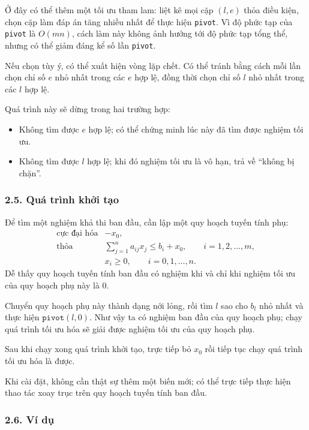 \documentclass[11pt]{article}
\begin{document}
Ở đây có thể thêm một tối ưu tham lam: liệt kê mọi cặp \((l,e)\) thỏa điều
kiện, chọn cặp làm đáp án tăng nhiều nhất để thực hiện \texttt{pivot}. Vì độ
phức tạp của \texttt{pivot} là \(O(mn)\), cách làm này không ảnh hưởng tới độ
phức tạp tổng thể, nhưng có thể giảm đáng kể số lần \texttt{pivot}.

Nếu chọn tùy ý, có thể xuất hiện vòng lặp chết. Có thể tránh bằng cách mỗi
lần chọn chỉ số \(e\) nhỏ nhất trong các \(e\) hợp lệ, đồng thời chọn chỉ số
\(l\) nhỏ nhất trong các \(l\) hợp lệ.

Quá trình này sẽ dừng trong hai trường hợp:
\begin{itemize}
  \item Không tìm được \(e\) hợp lệ; có thể chứng minh lúc này đã tìm được
  nghiệm tối ưu.
  \item Không tìm được \(l\) hợp lệ; khi đó nghiệm tối ưu là vô hạn, trả về
  ``không bị chặn''.
\end{itemize}

\subsubsection*{2.5. Quá trình khởi tạo}

Để tìm một nghiệm khả thi ban đầu, cần lập một quy hoạch tuyến tính phụ:
\[
\begin{array}{ll}
\text{cực đại hóa} & -x_0,\\[0.3em]
\text{thỏa} &
  \displaystyle \sum_{j=1}^{n}a_{ij}x_j\le b_i+x_0,
  \qquad i=1,2,\ldots,m,\\[0.4em]
& x_i\ge 0,\qquad i=0,1,\ldots,n.
\end{array}
\]
Dễ thấy quy hoạch tuyến tính ban đầu có nghiệm khi và chỉ khi nghiệm tối ưu
của quy hoạch phụ này là \(0\).

Chuyển quy hoạch phụ này thành dạng nới lỏng, rồi tìm \(l\) sao cho \(b_l\)
nhỏ nhất và thực hiện \(\texttt{pivot}(l,0)\). Như vậy ta có nghiệm ban đầu
của quy hoạch phụ; chạy quá trình tối ưu hóa sẽ giải được nghiệm tối ưu của
quy hoạch phụ.

Sau khi chạy xong quá trình khởi tạo, trực tiếp bỏ \(x_0\) rồi tiếp tục chạy
quá trình tối ưu hóa là được.

Khi cài đặt, không cần thật sự thêm một biến mới; có thể trực tiếp thực hiện
thao tác xoay trục trên quy hoạch tuyến tính ban đầu.

\subsubsection*{2.6. Ví dụ}
\end{document}

